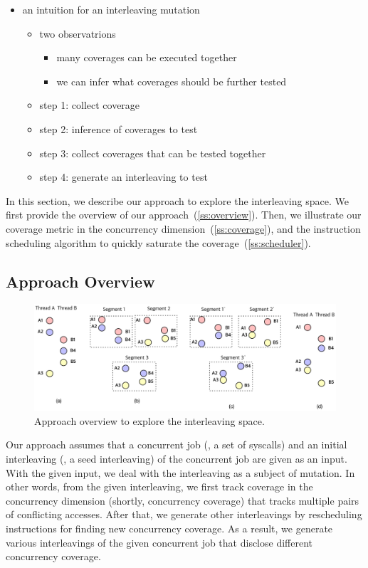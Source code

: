 {\begin{itemize}
\item an intuition for an interleaving mutation
  \begin{itemize}
  \item two observatrions
    \begin{itemize}
      \item many coverages can be executed together
      \item we can infer what coverages should be further tested
      \end{itemize}
  \item step 1: collect coverage
  \item step 2: inference of coverages to test
  \item step 3: collect coverages that can be tested together
  \item step 4: generate an interleaving to test
  \end{itemize}
\end{itemize}
}


In this section, we describe our approach to explore the interleaving
space.
%
We first provide the overview of our
approach~(\autoref{ss:overview}). Then, we illustrate our coverage
metric in the concurrency dimension~(\autoref{ss:coverage}), and the
instruction scheduling algorithm to quickly saturate the
coverage~(\autoref{ss:scheduler}).

\subsection{Approach Overview}
\label{ss:overview}

\begin{figure}[ht]
  \includegraphics[width=0.9\linewidth]{fig/intuition.pdf}
  \caption{Approach overview to explore the interleaving
    space. }
  \label{fig:overview}
\end{figure}


Our approach assumes that a concurrent job (\eg, a set of syscalls)
and an initial interleaving (\eg, a seed interleaving) of the
concurrent job are given as an input.
%
With the given input, we deal with the interleaving as a subject of
mutation. In other words, from the given interleaving, we first track
coverage in the concurrency dimension (shortly, concurrency coverage)
that tracks multiple pairs of conflicting accesses. After that, we
generate other interleavings by rescheduling instructions for finding
new concurrency coverage.
%
As a result, we generate various interleavings of the given concurrent
job that disclose different concurrency coverage.

